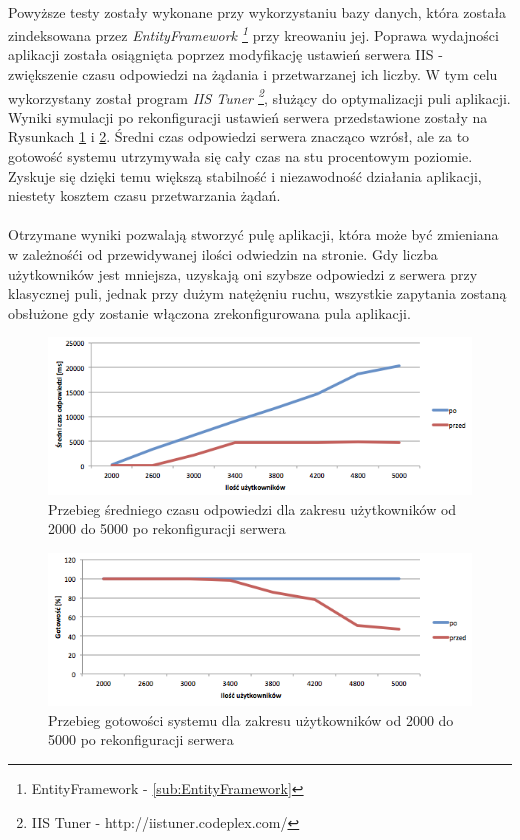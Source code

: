 \paragraph{} %
\label{par:}
Powyższe testy zostały wykonane przy wykorzystaniu bazy danych, która została zindeksowana przez \textit{EntityFramework \footnote{EntityFramework - \ref{sub:EntityFramework}}} przy kreowaniu jej. Poprawa wydajności aplikacji została osiągnięta poprzez modyfikację ustawień serwera IIS -  zwiększenie czasu odpowiedzi na żądania i przetwarzanej ich liczby. W tym celu wykorzystany został program \textit{IIS Tuner \footnote{IIS Tuner - http://iistuner.codeplex.com/}}, służący do optymalizacji puli aplikacji. Wyniki symulacji po rekonfiguracji ustawień serwera przedstawione zostały na Rysunkach \ref{fig:sred3} i \ref{fig:got3}. Średni czas odpowiedzi serwera znacząco wzrósł, ale za to gotowość systemu utrzymywała się cały czas na stu procentowym poziomie. Zyskuje się dzięki temu większą stabilność i niezawodność działania aplikacji, niestety kosztem czasu przetwarzania żądań. 
\paragraph{} %
\label{par:}
Otrzymane wyniki pozwalają stworzyć pulę aplikacji, która może być zmieniana w zależnośći od przewidywanej ilości odwiedzin na stronie. Gdy liczba użytkowników jest mniejsza, uzyskają oni szybsze odpowiedzi z serwera przy klasycznej puli, jednak przy dużym natężęniu ruchu, wszystkie zapytania zostaną obsłużone gdy zostanie włączona zrekonfigurowana pula aplikacji.

\begin{figure}[ht]
	\centering
		\includegraphics[width=1\linewidth]{assets/sredni3.png}
		\caption{Przebieg średniego czasu odpowiedzi dla zakresu użytkowników od 2000 do 5000 po rekonfiguracji serwera}
	\label{fig:sred3}
\end{figure}

\begin{figure}[ht]
	\centering
		\includegraphics[width=1\linewidth]{assets/gotowosc3.png}
		\caption{Przebieg gotowości systemu dla zakresu użytkowników od 2000 do 5000 po rekonfiguracji serwera}
	\label{fig:got3}
\end{figure}
